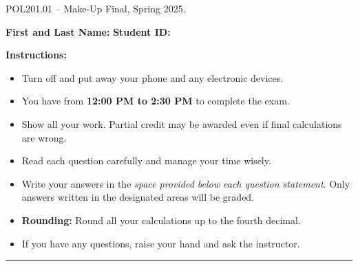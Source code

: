 \documentclass{article}
\begin{document}
 \hspace{1em} \vspace{-1.7em} %
\begin{center}
   \Large    POL201.01 -- Make-Up Final, Spring 2025.
\end{center}

\vspace{1em}
\noindent\textbf{First and Last Name:} \underline{\hspace{8cm}}  \quad  \textbf{Student ID:} \underline{\hspace{4.4cm}} 

\vspace{0.7em}
\noindent\textbf{Instructions:} 

\vspace{-0.8em}
\begin{itemize}
    \setlength{\itemsep}{-0.35em}
    \item Turn off and put away your phone and any electronic devices.
    \item You have from \textbf{12:00 PM to 2:30 PM} to complete the exam.
    \item Show all your work. Partial credit may be awarded even if final calculations are wrong.
    \item Read each question carefully and manage your time wisely.
    \item Write your answers in the \emph{space provided below each question statement}. Only answers written in the designated areas will be graded.
    \item \textbf{Rounding:} Round all your calculations up to the fourth decimal.
    \item If you have any questions, raise your hand and ask the instructor.
\end{itemize}
\vspace{-1.1em}
\noindent\rule{\linewidth}{0.4pt} %

\end{document}
